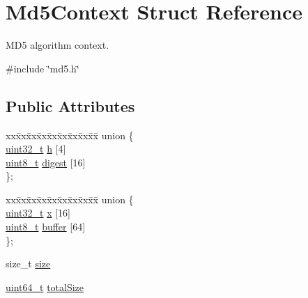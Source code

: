 \hypertarget{structMd5Context}{}\section{Md5\+Context Struct Reference}
\label{structMd5Context}


M\+D5 algorithm context.  




{\ttfamily \#include \char`\"{}md5.\+h\char`\"{}}

\subsection*{Public Attributes}
\begin{DoxyCompactItemize}
\item 
\begin{tabbing}
xx\=xx\=xx\=xx\=xx\=xx\=xx\=xx\=xx\=\kill
union \{\\
\>\hyperlink{stdint_8h_a435d1572bf3f880d55459d9805097f62}{uint32\_t} \hyperlink{structMd5Context_afcd35f42c47833b4acef6ebabf9a2bcd}{h} \mbox{[}4\mbox{]}\\
\>\hyperlink{stdint_8h_aba7bc1797add20fe3efdf37ced1182c5}{uint8\_t} \hyperlink{structMd5Context_a2f29146370d91b5b9b9a6bd6f9b8f79b}{digest} \mbox{[}16\mbox{]}\\
\}; \\

\end{tabbing}\item 
\begin{tabbing}
xx\=xx\=xx\=xx\=xx\=xx\=xx\=xx\=xx\=\kill
union \{\\
\>\hyperlink{stdint_8h_a435d1572bf3f880d55459d9805097f62}{uint32\_t} \hyperlink{structMd5Context_addf9a6d04005abcf8946f5552462344c}{x} \mbox{[}16\mbox{]}\\
\>\hyperlink{stdint_8h_aba7bc1797add20fe3efdf37ced1182c5}{uint8\_t} \hyperlink{structMd5Context_aef6cb68a2c65dcfc8274b356263db671}{buffer} \mbox{[}64\mbox{]}\\
\}; \\

\end{tabbing}\item 
size\+\_\+t \hyperlink{structMd5Context_aa802ea44a60442aac9d00dbbb239d41e}{size}
\item 
\hyperlink{stdint_8h_aec6fcb673ff035718c238c8c9d544c47}{uint64\+\_\+t} \hyperlink{structMd5Context_a32a910e80c0df0da1312dd192054c390}{total\+Size}
\end{DoxyCompactItemize}


